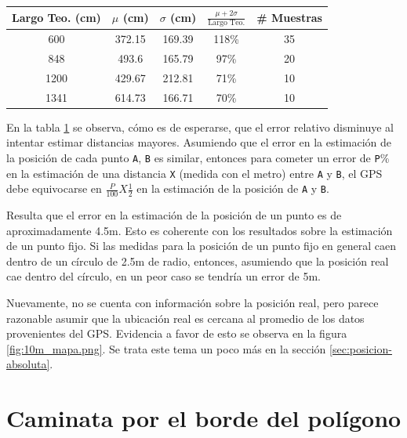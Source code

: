 \documentclass[main]{subfiles}
\begin{document}
\begin{table}[H]
\vspace{-10pt}
\begin{center}
\begin{tabular}{|c|c|c|c|c|}
\hline
\textbf{Largo Teo. (cm)} & $\mu$ (cm) & $\sigma$ (cm)  & $\frac{\mu + 2\sigma}{\text{Largo Teo.}}$ & \textbf{\# Muestras} \\
\hline
\rowcolor[gray]{0.9}
600 & 372.15 & 169.39 & 118\% & 35\\
\hline
\rowcolor[gray]{0.8}
848 & 493.6 & 165.79 & 97\%& 20\\
\hline
\rowcolor[gray]{0.9}
1200 & 429.67 & 212.81 & 71\% & 10\\
\hline
\rowcolor[gray]{0.8}
1341 & 614.73 & 166.71 & 70\% & 10\\
\hline
\end{tabular}
\caption{}
\label{tab:err-rectas}
\end{center}
\vspace{-20pt}
\end{table}

En la tabla \ref{tab:err-rectas} se observa, cómo es de esperarse, que el error relativo disminuye al intentar estimar distancias mayores. Asumiendo que el error en la estimación de la posición de cada punto \verb+A+, \verb+B+ es similar, entonces para cometer un error de \verb+P+\% en la estimación de una distancia \verb+X+ (medida con el metro) entre \verb+A+ y \verb+B+, el GPS debe equivocarse en $\frac{P}{100}X\frac{1}{2}$ en la estimación de la posición de \verb+A+ y \verb+B+.

Resulta que el error en la estimación de la posición de un punto es de aproximadamente 4.5m. Esto es coherente con los resultados sobre la estimación de un punto fijo. Si las medidas para la posición de un punto fijo en general caen dentro de un círculo de 2.5m de radio, entonces, asumiendo que la posición real cae dentro del círculo, en un peor caso se tendría un error de 5m. 

Nuevamente, no se cuenta con información sobre la posición real, pero parece razonable asumir que la ubicación real es cercana al promedio de los datos provenientes del GPS. Evidencia a favor de esto se observa en la figura \ref{fig:10m_mapa.png}. Se trata este tema un poco más en la sección \ref{sec:posicion-absoluta}.

\section{Caminata por el borde del polígono}
\label{sec:caminata-por-el-borde-del-poligono}
\end{document}
